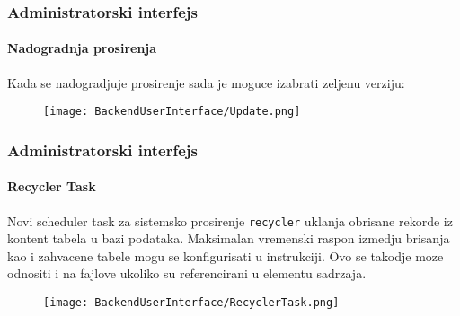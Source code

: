 \begin{frame}[fragile]
	\frametitle{Administratorski interfejs}
	\framesubtitle{Nadogradnja prosirenja}

	Kada se nadogradjuje prosirenje sada je moguce izabrati zeljenu verziju:

	\begin{figure}
		\texttt{[image: BackendUserInterface/Update.png]}
	\end{figure}

\end{frame}

\begin{frame}[fragile]
	\frametitle{Administratorski interfejs}
	\framesubtitle{Recycler Task}

	Novi scheduler task za sistemsko prosirenje \texttt{recycler} uklanja obrisane rekorde iz kontent tabela u bazi podataka. Maksimalan vremenski raspon izmedju brisanja kao i zahvacene tabele mogu se konfigurisati u instrukciji.
	\newline
	Ovo se takodje moze odnositi i na fajlove ukoliko su referencirani u elementu sadrzaja.

	\begin{figure}
		\texttt{[image: BackendUserInterface/RecyclerTask.png]}
	\end{figure}

\end{frame}

